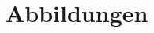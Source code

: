 \section{Abbildungen}\label{sec:abbildungen}
%
%
%
%
%
%
\ifx\fulldocument\undefined
  \printnomenclature
  \printbibliography
  
\fi
%
